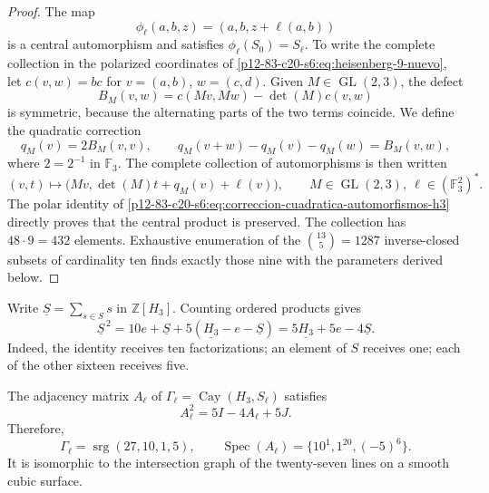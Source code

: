 \begin{proof}
The map
\[
 \phi_\ell(a,b,z)=(a,b,z+\ell(a,b))
\]
is a central automorphism and satisfies
\(\phi_\ell(S_0)=S_\ell\). To write the complete collection in the
polarized coordinates of \cref{p12-83-c20-s6:eq:heisenberg-9-nuevo}, let
\(c(v,w)=b c\) for \(v=(a,b)\), \(w=(c,d)\). Given
\(M\in\operatorname{GL}(2,3)\), the defect
\[
 B_M(v,w)=c(Mv,Mw)-\det(M)c(v,w)
\]
is symmetric, because the alternating parts of the two terms coincide.
We define the quadratic correction
\begin{equation}
 q_M(v)=2B_M(v,v),
 \qquad
 q_M(v+w)-q_M(v)-q_M(w)=B_M(v,w),
 \label{p12-83-c20-s6:eq:correccion-cuadratica-automorfismos-h3}
\end{equation}
where \(2=2^{-1}\) in \(\mathbb F_3\). The complete collection of
automorphisms is then written
\begin{equation}
 (v,t)\longmapsto
 \bigl(Mv,\det(M)t+q_M(v)+\ell(v)\bigr),
 \qquad M\in\operatorname{GL}(2,3),\
 \ell\in(\mathbb F_3^2)^*.
 \label{p12-83-c20-s6:eq:automorfismos-h3-completos}
\end{equation}
The polar identity of \cref{p12-83-c20-s6:eq:correccion-cuadratica-automorfismos-h3}
directly proves that the central product is preserved. The collection has
\(48\cdot9=432\) elements. Exhaustive enumeration of the
\(\binom{13}{5}=1287\) inverse-closed subsets of cardinality ten
finds exactly those nine with the parameters derived
below.
\end{proof}

Write \(\underline S=\sum_{s\in S}s\) in
\(\mathbb Z[H_3]\). Counting ordered products gives
\begin{equation}
 \underline S^{\,2}
 =10e+\underline S+5(\underline{H_3}-e-\underline S)
 =5\underline{H_3}+5e-4\underline S.
 \label{p12-83-c20-s6:eq:identidad-grupo-schlafli-nueva}
\end{equation}
Indeed, the identity receives ten factorizations; an element of
\(S\) receives one; each of the other sixteen receives five.

\begin{theorem}
\label{p12-83-c20-s6:thm:grafo-27-rectas-nuevo}
The adjacency matrix \(A_\ell\) of
\(\Gamma_\ell=\operatorname{Cay}(H_3,S_\ell)\) satisfies
\begin{equation}
 A_\ell^2=5I-4A_\ell+5J.
 \label{p12-83-c20-s6:eq:identidad-schlafli-nueva}
\end{equation}
Therefore,
\[
 \Gamma_\ell=\operatorname{srg}(27,10,1,5),
 \qquad
 \operatorname{Spec}(A_\ell)=\{10^1,1^{20},(-5)^6\}.
\]
It is isomorphic to the intersection graph of the twenty-seven lines on a
smooth cubic surface.
\end{theorem}

